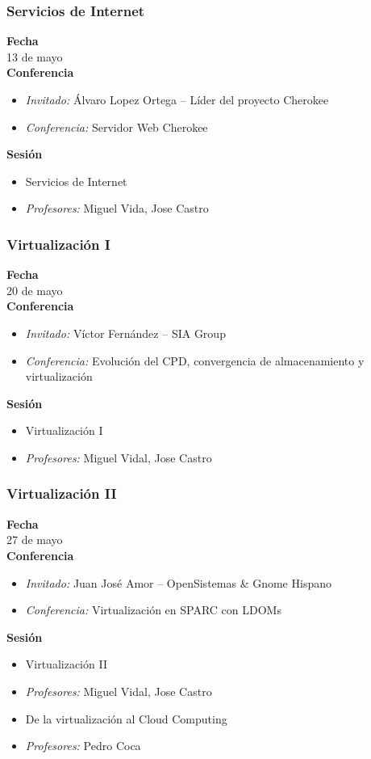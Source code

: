 \documentclass{beamer}
\begin{document}
\begin{frame}
  \frametitle{Servicios de Internet}
  \textbf{Fecha}\\
  \hspace{0.3cm}13 de mayo\\
  \textbf{Conferencia}
    \begin{itemize}
      \item \textit{Invitado:} Álvaro Lopez Ortega -- Líder del proyecto Cherokee
      \item \textit{Conferencia:} Servidor Web Cherokee
    \end{itemize}
  \textbf{Sesión}
    \begin{itemize}
      \item Servicios de Internet
      \item \textit{Profesores:} Miguel Vida, Jose Castro
    \end{itemize}
\end{frame}

\begin{frame}
  \frametitle{Virtualización I}
  \textbf{Fecha}\\
  \hspace{0.3cm}20 de mayo\\
  \textbf{Conferencia}
    \begin{itemize}
      \item \textit{Invitado:} Víctor Fernández -- SIA Group
      \item \textit{Conferencia:} Evolución del CPD, convergencia de almacenamiento y virtualización
    \end{itemize}
  \textbf{Sesión}
    \begin{itemize}
      \item Virtualización I
      \item \textit{Profesores:} Miguel Vidal, Jose Castro
    \end{itemize}
\end{frame}

\begin{frame}
  \frametitle{Virtualización II}
  \textbf{Fecha}\\
  \hspace{0.3cm}27 de mayo\\
  \textbf{Conferencia}
    \begin{itemize}
      \item \textit{Invitado:} Juan José Amor -- OpenSistemas \& Gnome Hispano
      \item \textit{Conferencia:} Virtualización en SPARC con LDOMs
    \end{itemize}
  \textbf{Sesión}
    \begin{itemize}
      \item Virtualización II
      \item \textit{Profesores:} Miguel Vidal, Jose Castro
    \end{itemize}
    \begin{itemize}
      \item De la virtualización al Cloud Computing
      \item \textit{Profesores:} Pedro Coca
    \end{itemize}
\end{frame}
\end{document}
